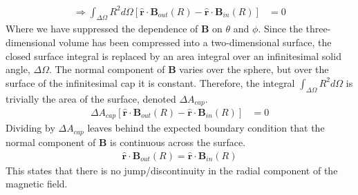 \documentclass{article}
\begin{document}
\begin{align}
    \Longrightarrow \int_{\Delta\Omega} R^2d\Omega\left[\mathbf{\hat{r}}\cdot\mathbf{B}_{out}(R) - \mathbf{\hat{r}}\cdot\mathbf{B}_{in}(R)\right] &= 0
\end{align}
Where we have suppressed the dependence of $\mathbf{B}$ on $\theta$ and $\phi$. Since the three-dimensional volume has been compressed into a two-dimensional surface, the closed surface integral is replaced by an area integral over an infinitesimal solid angle, $\Delta\Omega$. The normal component of $\mathbf{B}$ varies over the sphere, but over the surface of the infinitesimal cap it is constant. Therefore, the integral $\int_{\Delta\Omega} R^2d\Omega$ is trivially the area of the surface, denoted $\Delta A_{cap}$.
\begin{align}
    \Delta A_{cap}\left[\mathbf{\hat{r}}\cdot\mathbf{B}_{out}(R) - \mathbf{\hat{r}}\cdot\mathbf{B}_{in}(R)\right] &= 0
\end{align}
Dividing by $\Delta A_{cap}$ leaves behind the expected boundary condition that the normal component of $\mathbf{B}$ is continuous across the surface.
\begin{align}
    \boxed{\mathbf{\hat{r}}\cdot\mathbf{B}_{out}(R) =  \mathbf{\hat{r}}\cdot\mathbf{B}_{in}(R)} \label{BCrad}
\end{align}
This states that there is no jump/discontinuity in the radial component of the magnetic field.

\end{document}
